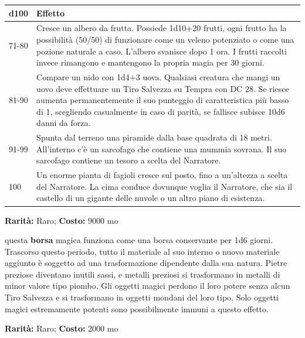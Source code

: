 \begin{multicols}{2}
\begin{tabularx}{\linewidth}{lX}
\toprule
\rowcolor{gray!20}\textbf{d100} & \textbf{Effetto}\\
\toprule
71-80 &Cresce un albero da frutta. Possiede 1d10+20 frutti, ogni frutto ha la possibilità (50/50) di funzionare come un veleno potenziato o come una pozione naturale a caso. L'albero svanisce dopo 1 ora. I frutti raccolti invece rimangono e mantengono la propria magia per 30 giorni. \\
\rowcolor{gray!20}81-90 &Compare un nido con 1d4+3 uova. Qualsiasi creatura che mangi un uovo deve effettuare un Tiro Salvezza su Tempra con DC 28. Se riesce aumenta permanentemente il suo punteggio di caratteristica più basso di 1, scegliendo casualmente in caso di parità, se fallisce subisce 10d6 danni da forza.\\
91-99 &Spunta dal terreno una piramide dalla base quadrata di 18 metri. All'interno c'è un sarcofago che contiene una mummia sovrana. Il suo sarcofago contiene un tesoro a scelta del Narratore.\\
\rowcolor{gray!20}100 &Un enorme pianta di fagioli cresce sul posto, fino a un'altezza a scelta del Narratore. La cima conduce dovunque voglia il Narratore, che sia il castello di un gigante delle nuvole o un altro piano di esistenza.
\end{tabularx}
%


\medskip


\textbf{Rarità:} Raro; \textbf{Costo:} 9000 mo

questa \textbf{borsa} magica funziona come una borsa conservante per 1d6 giorni. Trascorso questo periodo, tutto il materiale al suo interno o nuovo materiale aggiunto è soggetto ad una trasformazione dipendente dalla sua natura. Pietre preziose diventano inutili sassi, e metalli preziosi si trasformano in metalli di minor valore tipo piombo. Gli oggetti magici perdono il loro potere senza alcun Tiro Salvezza e si trasformano in oggetti mondani del loro tipo. Solo oggetti magici estremamente potenti sono possibilmente immuni a questo effetto.


\textbf{Rarità:} Raro; \textbf{Costo:} 2000 mo


\end{multicols}
